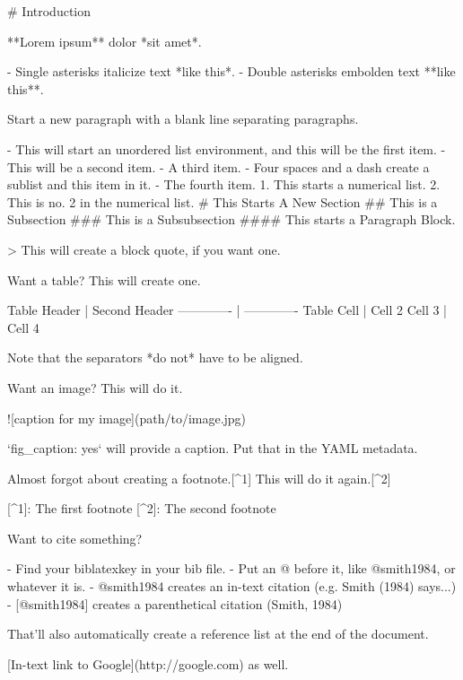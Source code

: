 \documentclass[11pt,]{article}
\newenvironment{Shaded}{\begin{snugshade}}{\end{snugshade}}
\newcommand{\AlertTok}[1]{\textcolor[rgb]{0.94,0.16,0.16}{#1}}
\newcommand{\BaseNTok}[1]{\textcolor[rgb]{0.00,0.00,0.81}{#1}}
\newcommand{\DataTypeTok}[1]{\textcolor[rgb]{0.13,0.29,0.53}{#1}}
\newcommand{\FloatTok}[1]{\textcolor[rgb]{0.00,0.00,0.81}{#1}}
\newcommand{\FunctionTok}[1]{\textcolor[rgb]{0.00,0.00,0.00}{#1}}
\newcommand{\NormalTok}[1]{#1}
\newcommand{\OtherTok}[1]{\textcolor[rgb]{0.56,0.35,0.01}{#1}}
\begin{document}
\begin{Shaded}
\begin{Highlighting}[]

\FunctionTok{# Introduction}

\NormalTok{**Lorem ipsum** dolor *sit amet*. }

\NormalTok{- }\FloatTok{Single asterisks italicize text *like this*. }
\FloatTok{- Double asterisks embolden text **like this**.}

\NormalTok{Start a new paragraph with a blank line separating paragraphs.}

\NormalTok{- }\FloatTok{This will start an unordered list environment, and this will be the first item.}
\FloatTok{- This will be a second item.}
\FloatTok{- A third item.}
\FloatTok{    - Four spaces and a dash create a sublist and this item in it.}
\FloatTok{- The fourth item.}
\FloatTok{    }
\FloatTok{1. This starts a numerical list.}
\FloatTok{2. This is no. 2 in the numerical list.}
\FloatTok{    }
\FloatTok{# This Starts A New Section}
\FloatTok{## This is a Subsection}
\FloatTok{### This is a Subsubsection}
\FloatTok{#### This starts a Paragraph Block.}

\NormalTok{>}\DataTypeTok{ This will create a block quote, if you want one.}

\NormalTok{Want a table? This will create one.}

\NormalTok{Table Header  | Second Header}
\NormalTok{------------- | -------------}
\NormalTok{Table Cell    | Cell 2}
\NormalTok{Cell 3        | Cell 4 }

\NormalTok{Note that the separators *do not* have to be aligned.}

\NormalTok{Want an image? This will do it.}

\AlertTok{![caption for my image](path/to/image.jpg)}

\BaseNTok{`fig_caption: yes`}\NormalTok{ will provide a caption. Put that in the YAML metadata.}

\NormalTok{Almost forgot about creating a footnote.}\OtherTok{[^1]}\NormalTok{ This will do it again.}\OtherTok{[^2]}

\OtherTok{[^1]}\NormalTok{: The first footnote}
\OtherTok{[^2]}\NormalTok{: The second footnote}

\NormalTok{Want to cite something? }

\NormalTok{- }\FloatTok{Find your biblatexkey in your bib file.}
\FloatTok{- Put an @ before it, like @smith1984, or whatever it is.}
\FloatTok{- @smith1984 creates an in-text citation (e.g. Smith (1984) says...)}
\FloatTok{- [@smith1984] creates a parenthetical citation (Smith, 1984)}

\NormalTok{That'll also automatically create a reference list at the end of the document.}

\OtherTok{[In-text link to Google](http://google.com)}\NormalTok{ as well.}
\end{Highlighting}
\end{Shaded}
\end{document}
